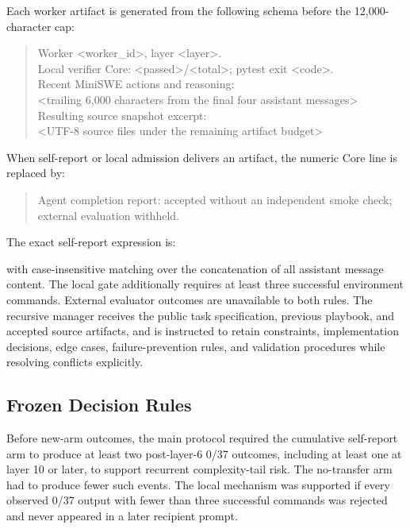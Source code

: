 \documentclass[letterpaper]{article}
\begin{document}
Each worker artifact is generated from the following schema before the
12,000-character cap:
\begin{quote}
\footnotesize\ttfamily
Worker <worker\_id>, layer <layer>.\\
Local verifier Core: <passed>/<total>; pytest exit <code>.\\
Recent MiniSWE actions and reasoning:\\
<trailing 6,000 characters from the final four assistant messages>\\
Resulting source snapshot excerpt:\\
<UTF-8 source files under the remaining artifact budget>
\end{quote}
When self-report or local admission delivers an artifact, the numeric Core line
is replaced by:
\begin{quote}
\footnotesize\ttfamily
Agent completion report: accepted without an independent smoke check;\\
external evaluation withheld.
\end{quote}
The exact self-report expression is:
\begin{quote}
\footnotesize\ttfamily
{}
\end{quote}
with case-insensitive matching over the concatenation of all assistant message
content. The local gate additionally requires at least three successful
environment commands. External evaluator outcomes are unavailable to both
rules. The recursive manager receives the public task specification, previous
playbook, and accepted source artifacts, and is instructed to retain constraints,
implementation decisions, edge cases, failure-prevention rules, and validation
procedures while resolving conflicts explicitly.

\subsection{Frozen Decision Rules}

Before new-arm outcomes, the main protocol required the cumulative
self-report arm to produce at least two post-layer-6 0/37 outcomes, including
at least one at layer 10 or later, to support recurrent complexity-tail risk.
The no-transfer arm had to produce fewer such events. The local mechanism was
supported if every observed 0/37 output with fewer than three successful
commands was rejected and never appeared in a later recipient prompt.
\end{document}
